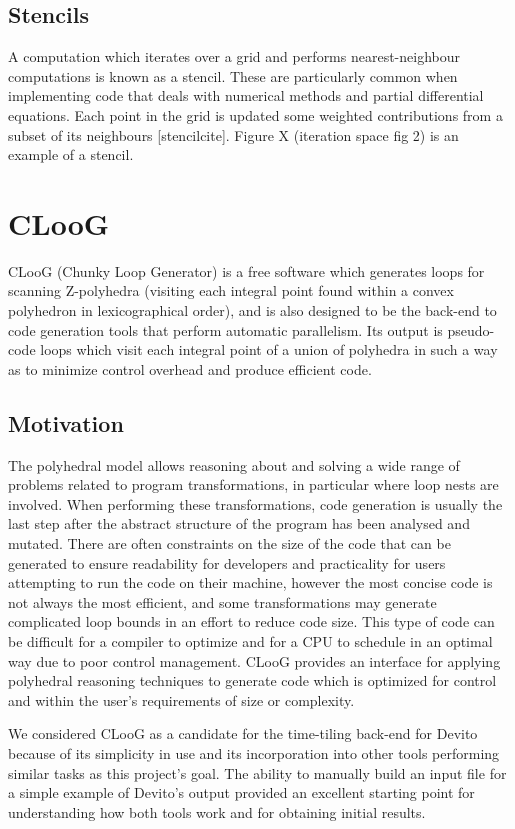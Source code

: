 \documentclass[a4paper,12pt,twoside]{report}
\begin{document}
\subsection*{Stencils}
A computation which iterates over a grid and performs nearest-neighbour computations is known as a stencil. These are
particularly common when implementing code that deals with numerical methods and partial differential equations.
Each point in the grid is updated some weighted contributions from a subset of its neighbours [stencilcite]. Figure X (iteration
space fig 2) is an example of a stencil.

\section{CLooG}
CLooG (Chunky Loop Generator) is a free software which generates loops for scanning Z-polyhedra (visiting each integral
point found within a convex polyhedron in lexicographical order), and is also designed to be
the back-end to code generation tools that perform automatic parallelism. Its output is pseudo-code loops which visit
each integral point of a union of polyhedra in such a way as to minimize control overhead and produce efficient code.

\subsection*{Motivation}
The polyhedral model allows reasoning about and solving a wide range of problems related to program transformations,
in particular where loop nests are involved. When performing these transformations, code generation is usually the last
step after the abstract structure of the program has been analysed and mutated. There are often constraints on the size of the code
that can be generated to ensure readability for developers and practicality for users attempting to run the code on their machine,
however the most concise code is not always the most efficient, and some transformations may generate complicated loop bounds in an effort
to reduce code size. This type of code can be difficult for a compiler to optimize and for a CPU to schedule in an optimal way due to
poor control management. CLooG provides an interface for applying polyhedral reasoning techniques to generate code which is optimized for control
and within the user's requirements of size or complexity.

We considered CLooG as a candidate for the time-tiling back-end for Devito because of its simplicity in use and its incorporation into
other tools performing similar tasks as this project's goal. The ability to manually build an input file for a simple example of Devito's
output provided an excellent starting point for understanding how both tools work and for obtaining initial results.
\end{document}
